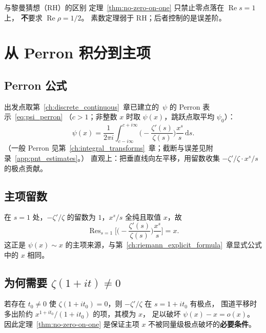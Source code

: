 \begin{remark}{与黎曼猜想（RH）的区别}{}
定理~\ref{thm:no-zero-on-one} 只禁止零点落在 $\operatorname{Re}s=1$ 上，
\textbf{不}要求 $\operatorname{Re}\rho=1/2$。
素数定理弱于 RH；后者控制的是误差阶。
\end{remark}

\section{从 Perron 积分到主项}\label{sec:pnt_perron_outline}

\subsection{Perron 公式}
出发点取第~\ref{ch:discrete_continuous}~章已建立的~$\psi$ 的 Perron 表示~\eqref{eq:psi_perron}
（$c>1$；非整数 $x$ 时取 $\psi(x)$，跳跃点取平均 $\psi_0$）：
\[
  \psi(x)
  =\frac{1}{2\pi i}
  \int_{c-i\infty}^{c+i\infty}
  \Biggl(-\frac{\zeta'(s)}{\zeta(s)}\Biggr)
  \frac{x^{s}}{s}\,\mathrm{d}s.
\]
（一般 Perron 见第~\ref{ch:integral_transforms}~章；截断与误差见附录~\ref{app:pnt_estimates}。）
直观上：把垂直线向左平移，用留数收集 $-\zeta'/\zeta\cdot x^{s}/s$ 的极点贡献。

\subsection{主项留数}
在 $s=1$ 处，$-\zeta'/\zeta$ 的留数为 $1$，$x^{s}/s$ 全纯且取值 $x$，故
\begin{equation}
  \operatorname{Res}_{s=1}
  \Biggl[\Biggl(-\frac{\zeta'(s)}{\zeta(s)}\Biggr)\frac{x^{s}}{s}\Biggr]
  =x.
  \label{eq:pnt-residue-one}
\end{equation}
这正是 $\psi(x)\sim x$ 的主项来源，与第~\ref{ch:riemann_explicit_formula}~章显式公式中的 $x$ 相同。

\subsection{为何需要 $\zeta(1+it)\neq 0$}
若存在 $t_0\neq 0$ 使 $\zeta(1+it_0)=0$，则 $-\zeta'/\zeta$ 在 $s=1+it_0$ 有极点，
围道平移时多出阶约 $x^{1+it_0}/(1+it_0)$ 的项，其模为 $x$，
足以破坏 $\psi(x)-x=o(x)$。
因此定理~\ref{thm:no-zero-on-one} 是保证主项 $x$ 不被同量级极点破坏的\textbf{必要条件}。

